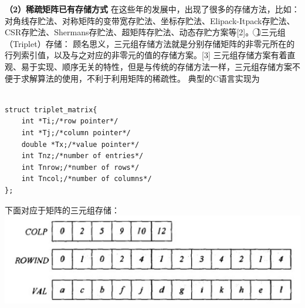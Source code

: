 \documentclass{article}
\begin{document}
\textbf{（2）稀疏矩阵已有存储方式}
      \qquad
\newline 
在这些年的发展中，出现了很多的存储方法，比如：对角线存贮法、对称矩阵的变带宽存贮法、坐标存贮法、Elipack-Itpack存贮法、CSR存贮法、Shermans存贮法、超矩阵存贮法、动态存贮方案等[2]。
\newline
\textcircled{1}三元组（Triplet）存储：
顾名思义，三元组存储方法就是分别存储矩阵的非零元所在的行列索引值，以及与之对应的非零元的值的存储方案。[3]
\newline
三元组存储方案有着直观、易于实现、顺序无关的特性，但是与传统的存储方法一样，三元组存储方案不便于求解算法的使用，不利于利用矩阵的稀疏性。
典型的C语言实现为\newline
\begin{lstlisting}

struct triplet_matrix{ 
	int *Ti;/*row pointer*/ 
	int *Tj;/*column pointer*/
	double *Tx;/*value pointer*/
	int Tnz;/*number of entries*/
	int Tnrow;/*number of rows*/
	int Tncol;/*number of columns*/
};

\end{lstlisting}
下面对应于矩阵的三元组存储：
\newline\newline\newline\newline\newline
\includegraphics[scale=0.25]{triplet.png}
\end{document}
